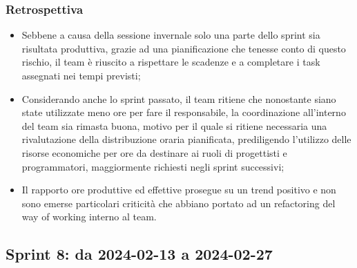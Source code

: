 \documentclass[10pt, a4paper]{article}
\begin{document}
\subsubsection{Retrospettiva}
\begin{itemize}
    \item Sebbene a causa della sessione invernale solo una parte dello sprint sia risultata produttiva, grazie
    ad una pianificazione che tenesse conto di questo rischio, il team è riuscito a rispettare le scadenze e a 
    completare i task assegnati nei tempi previsti;
    \item Considerando anche lo sprint passato, il team ritiene che nonostante siano state utilizzate meno ore per fare il responsabile,
    la coordinazione all'interno del team sia rimasta buona, motivo per il quale si ritiene necessaria una rivalutazione della distribuzione oraria pianificata, 
    prediligendo l'utilizzo delle risorse economiche per ore da destinare ai ruoli di progettisti e programmatori, maggiormente richiesti negli sprint successivi;
    \item Il rapporto ore produttive ed effettive prosegue su un trend positivo e non sono emerse particolari criticità
    che abbiano portato ad un refactoring del way of working interno al team.
\end{itemize}



\subsection{Sprint 8: da 2024-02-13 a 2024-02-27}
\end{document}
